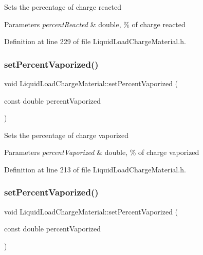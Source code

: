 Sets the percentage of charge reacted 
\begin{DoxyParams}{Parameters}
{\em percent\+Reacted} & double, \% of charge reacted \\
\hline
\end{DoxyParams}


Definition at line 229 of file Liquid\+Load\+Charge\+Material.\+h.

\mbox{\label{class_liquid_load_charge_material_aaf2aa3303201370a7b79e5b3f54e135a}} 
\subsubsection{\texorpdfstring{set\+Percent\+Vaporized()}{setPercentVaporized()}\hspace{0.1cm}{\footnotesize\ttfamily [1/3]}}
{\footnotesize\ttfamily void Liquid\+Load\+Charge\+Material\+::set\+Percent\+Vaporized (\begin{DoxyParamCaption}\item[{const double}]{percent\+Vaporized }\end{DoxyParamCaption})\hspace{0.3cm}{\ttfamily [inline]}}

Sets the percentage of charge vaporized 
\begin{DoxyParams}{Parameters}
{\em percent\+Vaporized} & double, \% of charge vaporized \\
\hline
\end{DoxyParams}


Definition at line 213 of file Liquid\+Load\+Charge\+Material.\+h.

\mbox{\label{class_liquid_load_charge_material_aaf2aa3303201370a7b79e5b3f54e135a}} 
\subsubsection{\texorpdfstring{set\+Percent\+Vaporized()}{setPercentVaporized()}\hspace{0.1cm}{\footnotesize\ttfamily [2/3]}}
{\footnotesize\ttfamily void Liquid\+Load\+Charge\+Material\+::set\+Percent\+Vaporized (\begin{DoxyParamCaption}\item[{const double}]{percent\+Vaporized }\end{DoxyParamCaption})\hspace{0.3cm}{\ttfamily [inline]}}

